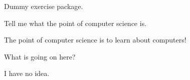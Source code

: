 \newline
Dummy exercise package.

\begin{exercise}
Tell me what the point of computer science is.
	\begin{solution}[]
	The point of computer science is to learn about computers!
	\end{solution}
\end{exercise}


\begin{exercise}
	
	What is going on here?
	
	\begin{solution}[]
	
	I have no idea.
	
	\end{solution}
\end{exercise}